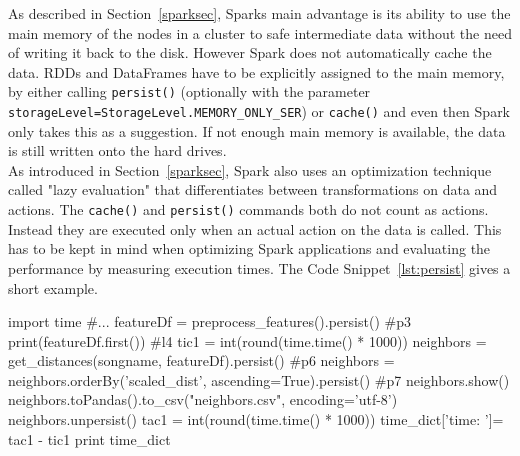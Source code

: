 As described in Section~\ref{sparksec}, Sparks main advantage is its ability to use the main memory of the nodes in a cluster to safe intermediate data without the need of writing it back to the disk. However Spark does not automatically cache the data. RDDs and DataFrames have to be explicitly assigned to the main memory, by either calling \lstinline{persist()} (optionally with the parameter \lstinline{storageLevel=StorageLevel.MEMORY_ONLY_SER}) or \lstinline{cache()} and even then Spark only takes this as a suggestion. If not enough main memory is available, the data is still written onto the hard drives.\\ As introduced in Section~\ref{sparksec}, Spark also uses an optimization technique called "lazy evaluation" that differentiates between transformations on data and actions. The \lstinline{cache()} and \lstinline{persist()} commands both do not count as actions. Instead they are executed only when an actual action on the data is called. This has to be kept in mind when optimizing Spark applications and evaluating the performance by measuring execution times. The Code Snippet~\ref{lst:persist} gives a short example. 

\begin{pythonCode}[frame=single,label={lst:persist},caption={Spark lazy evaluation},captionpos=b]
import time
#...
featureDf = preprocess_features().persist()	#p3
print(featureDf.first()) #l4
tic1 = int(round(time.time() * 1000))
neighbors = get_distances(songname, featureDf).persist() #p6
neighbors = neighbors.orderBy('scaled_dist', ascending=True).persist() #p7
neighbors.show()
neighbors.toPandas().to_csv("neighbors.csv", encoding='utf-8')
neighbors.unpersist()
tac1 = int(round(time.time() * 1000))
time_dict['time: ']= tac1 - tic1
print time_dict
\end{pythonCode}

